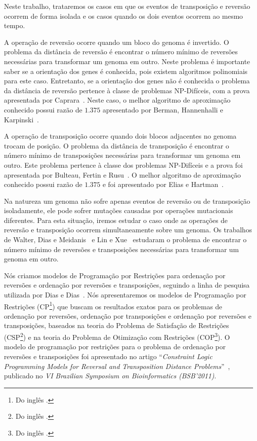 Neste trabalho, trataremos os casos em que os eventos de transposição e
reversão ocorrem de forma isolada e os casos quando os dois eventos
ocorrem ao mesmo tempo.

A operação de reversão ocorre quando um bloco do genoma é invertido. O
problema da distância de reversão é encontrar o número mínimo de
reversões necessárias para transformar um genoma em outro. Neste
problema é importante saber se a orientação dos genes é conhecida,
pois existem algoritmos polinomiais para este caso. Entretanto, se a
orientação dos genes não é conhecida o problema da distância de
reversão pertence à classe de problemas NP-Difíceis, com a prova
apresentada por Caprara~\cite{Caprara*1997}. Neste caso, o melhor
algoritmo de aproximação conhecido possui razão de $1.375$ apresentado
por Berman, Hannenhalli e
Karpinski~\cite{BermanHannenhalliKarpinski*2002}.

A operação de transposição ocorre quando dois blocos adjacentes no
genoma trocam de posição. O problema da distância de transposição é
encontrar o número mínimo de transposições necessárias para
transformar um genoma em outro. Este problema pertence à classe dos
problemas NP-Difíceis e a prova foi apresentada por Bulteau, Fertin e
Rusu~\cite{BulteauFertinRusu*2010}. O melhor algoritmo de aproximação
conhecido possui razão de $1.375$ e foi apresentado por Elias e
Hartman~\cite{EliasHartman*2006}.

Na natureza um genoma não sofre apenas eventos de reversão ou de
transposição isoladamente, ele pode sofrer mutações causadas por
operações mutacionais diferentes. Para esta situação, iremos estudar o
caso onde as operações de reversão e transposição ocorrem
simultaneamente sobre um genoma. Os trabalhos de Walter, Dias e
Meidanis~\cite{MeidanisWalterDias*2002,WalterDiasMeidanis*1998} e Lin e
Xue~\cite{LinXue*1999} estudaram o problema de encontrar o número mínimo
de reversões e transposições necessárias para transformar um genoma em
outro.

Nós criamos modelos de Programação por Restrições para ordenação por
reversões e ordenação por reversões e transposições, seguindo a linha de
pesquisa utilizada por Dias e Dias~\cite{DiasDias*2009}. Nós
apresentaremos os modelos de Programação por Restrições (CP\footnote{Do
inglês .}) que buscam os resultados exatos
para os problemas de ordenação por reversões, ordenação por
transposições e ordenação por reversões e transposições, baseados na
teoria do Problema de Satisfação de Restrições (CSP\footnote{Do inglês
.}) e na teoria do Problema de
Otimização com Restrições (COP\footnote{Do inglês .}). O modelo de programação por restrições para o
problema de ordenação por reversões e transposições foi apresentado no
artigo ``\textit{Constraint Logic Programming Models for Reversal and
Transposition Distance Problems}''~\cite{IizukaDias*2011}, publicado no
\textit{VI Brazilian Symposium on Bioinformatics (BSB'2011)}.

